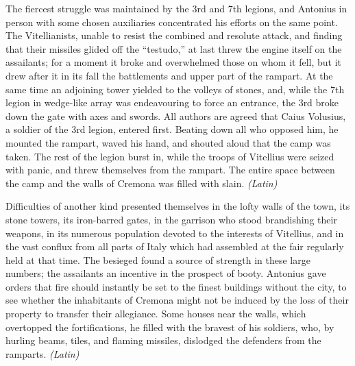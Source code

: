 The fiercest struggle was maintained by the 3rd and 7th legions, and Antonius in person with some chosen auxiliaries concentrated his efforts on the same point. The Vitellianists, unable to resist the combined and resolute attack, and finding that their missiles glided off the ``testudo,'' at last threw the engine itself on the assailants; for a moment it broke and overwhelmed those on whom it fell, but it drew after it in its fall the battlements and upper part of the rampart. At the same time an adjoining tower yielded to the volleys of stones, and, while the 7th legion in wedge-like array was endeavouring to force an entrance, the 3rd broke down the gate with axes and swords. All authors are agreed that Caius Volusius, a soldier of the 3rd legion, entered first. Beating down all who opposed him, he mounted the rampart, waved his hand, and shouted aloud that the camp was taken. The rest of the legion burst in, while the troops of Vitellius were seized with panic, and threw themselves from the rampart. The entire space between the camp and the walls of Cremona was filled with slain. \emph{(Latin)}


Difficulties of another kind presented themselves in the lofty walls of the town, its stone towers, its iron-barred gates, in the garrison who stood brandishing their weapons, in its numerous population devoted to the interests of Vitellius, and in the vast conflux from all parts of Italy which had assembled at the fair regularly held at that time. The besieged found a source of strength in these large numbers; the assailants an incentive in the prospect of booty. Antonius gave orders that fire should instantly be set to the finest buildings without the city, to see whether the inhabitants of Cremona might not be induced by the loss of their property to transfer their allegiance. Some houses near the walls, which overtopped the fortifications, he filled with the bravest of his soldiers, who, by hurling beams, tiles, and flaming missiles, dislodged the defenders from the ramparts. \emph{(Latin)}


